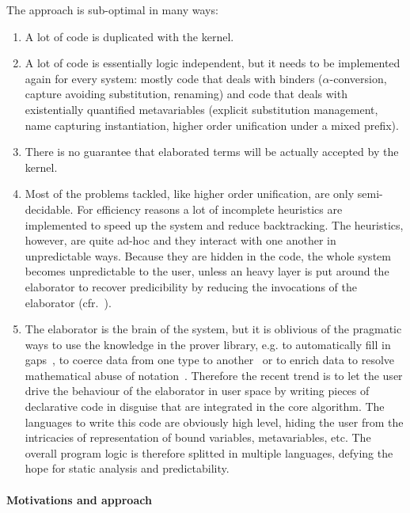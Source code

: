 \documentclass{easychair}
\begin{document}
The approach is sub-optimal in many ways:
\begin{enumerate}
\item A lot of code is duplicated with the kernel.
\item A lot of code is essentially logic independent, but it needs to
	be implemented again for every system: mostly code that deals
	with binders ($\alpha$-conversion, capture avoiding
	substitution, renaming) and code that deals with existentially
	quantified metavariables (explicit substitution management,
	name capturing instantiation, higher order unification under a
	mixed prefix).
\item There is no guarantee that elaborated terms will be actually
	accepted by the kernel.
\item Most of the problems tackled, like higher order unification, are
	only semi-decidable. For efficiency reasons a lot of
	incomplete heuristics are implemented to speed up the system
	and reduce backtracking. The heuristics, however, are quite
	ad-hoc and they interact with one another in unpredictable
	ways. Because they are hidden in the code, the whole system
	becomes unpredictable to the user, unless an heavy layer is
	put around the elaborator to recover predicibility by reducing
	the invocations of the elaborator (cfr.~\cite{SOZEAU?}).
\item The elaborator is the brain of the system, but it is oblivious
	of the pragmatic ways to use the knowledge in the prover
	library, e.g. to automatically fill in
	gaps~\cite{mathcomponents}, to coerce data from one type to
	another~\cite{coercivesubtyping} or to enrich data to resolve
	mathematical abuse of
	notation~\cite{nonuniformunificationhints}. Therefore the
	recent trend is to let the user drive the behaviour of the
	elaborator in user space by writing pieces of declarative code
	in disguise that are integrated in the core algorithm. The
	languages to write this code are obviously high level, hiding
	the user from the intricacies of representation of bound
	variables, metavariables, etc. The overall program logic is
	therefore splitted in multiple languages, defying the hope for
	static analysis and predictability.
\end{enumerate}

\paragraph{Motivations and approach}
\end{document}
